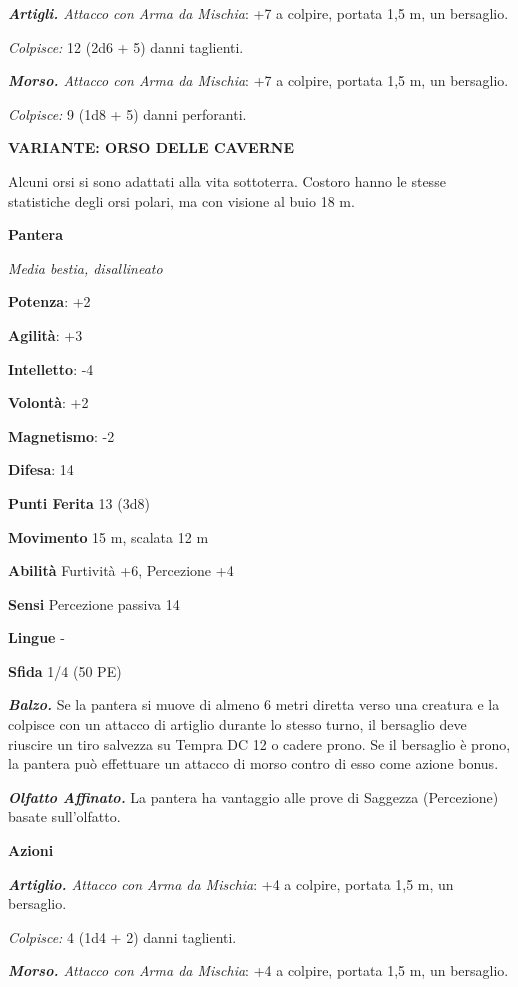 \begin{multicols}{2}
\emph{\textbf{Artigli.} Attacco con Arma da Mischia}: +7 a colpire,
portata 1,5 m, un bersaglio.

\emph{Colpisce:} 12 (2d6 + 5) danni taglienti.

\emph{\textbf{Morso.} Attacco con Arma da Mischia}: +7 a colpire,
portata 1,5 m, un bersaglio.

\emph{Colpisce:} 9 (1d8 + 5) danni perforanti.

\textbf{VARIANTE: ORSO DELLE CAVERNE}

Alcuni orsi si sono adattati alla vita sottoterra. Costoro hanno le
stesse statistiche degli orsi polari, ma con visione al buio 18 m.

\textbf{Pantera}

\emph{Media bestia, disallineato}

\textbf{Potenza}: +2

\textbf{Agilità}: +3

\textbf{Intelletto}: -4

\textbf{Volontà}: +2

\textbf{Magnetismo}: -2

\textbf{Difesa}: 14

\textbf{Punti Ferita} 13 (3d8)

\textbf{Movimento} 15 m, scalata 12 m

\textbf{Abilità} Furtività +6, Percezione +4

\textbf{Sensi} Percezione passiva 14

\textbf{Lingue} -

\textbf{Sfida} 1/4 (50 PE)

\emph{\textbf{Balzo.}} Se la pantera si muove di almeno 6 metri diretta
verso una creatura e la colpisce con un attacco di artiglio durante lo
stesso turno, il bersaglio deve riuscire un tiro salvezza su Tempra DC 12
o cadere prono. Se il bersaglio è prono, la pantera può effettuare un
attacco di morso contro di esso come azione bonus.

\emph{\textbf{Olfatto Affinato.}} La pantera ha vantaggio alle prove di
Saggezza (Percezione) basate sull'olfatto.

\textbf{Azioni}

\emph{\textbf{Artiglio.} Attacco con Arma da Mischia}: +4 a colpire,
portata 1,5 m, un bersaglio.

\emph{Colpisce:} 4 (1d4 + 2) danni taglienti.

\emph{\textbf{Morso.} Attacco con Arma da Mischia}: +4 a colpire,
portata 1,5 m, un bersaglio.


\end{multicols}
